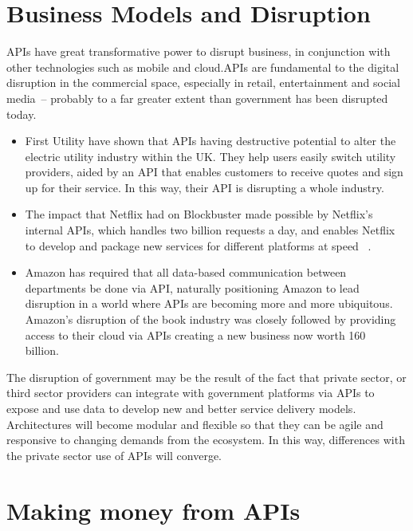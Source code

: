 \section{Business Models and Disruption}

APIs have great transformative power to disrupt business, in conjunction
with other technologies such as mobile and cloud.APIs are fundamental to the digital 
disruption in the commercial space,
especially in retail, entertainment and social media~\citep{api_economy}– probably
to a far greater extent than government has been disrupted today.
\begin{itemize}
	
	\item First Utility have shown that APIs having destructive potential to alter the electric utility industry within the UK. They help users easily switch utility providers, aided by an API that enables customers to receive quotes and sign up for their service. In this way, their API is disrupting a whole industry.
	
	
	\item The impact that Netflix had on Blockbuster made possible by
	Netflix’s internal APIs, which handles two billion requests a day,
	and enables Netflix to develop and package new services for different
	platforms at speed ~\citep{netflix_api}.
	
	\item Amazon has required that all data-based communication between
	departments be done via API, naturally positioning Amazon to lead
	disruption in a world where APIs are becoming more and more ubiquitous.
	Amazon’s disruption of the book industry was closely followed by providing
	access to their cloud via APIs creating a new business now worth 160 billion.~\citep{amazon_evangelist}
	
\end{itemize}

The disruption of government may be the result of the fact that private sector,
or third sector providers can integrate with government platforms via APIs
to expose and use data to develop new and better service delivery models.
Architectures will become modular and flexible so that they can be agile and responsive to
changing demands from the ecosystem. In this way, differences with the private sector
use of APIs will converge.

\section{Making money from APIs}

